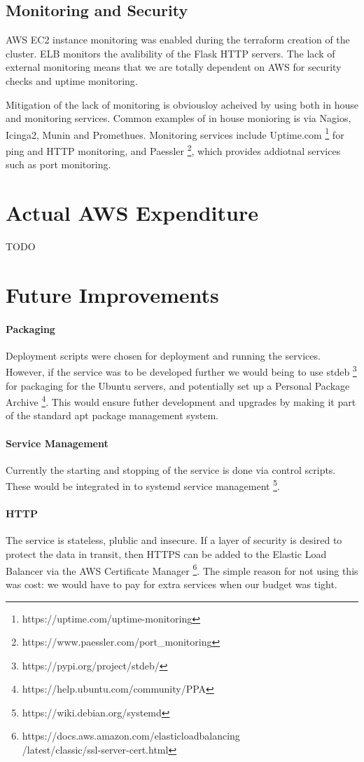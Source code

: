 \documentclass[conference]{IEEEtran}
\begin{document}
\subsection{Monitoring and Security}
AWS EC2 instance monitoring was enabled during the terraform creation of the cluster. ELB monitors the avalibility of the Flask HTTP servers. The lack of external monitoring means that we are totally dependent on AWS for security checks and uptime monitoring. \par
Mitigation of the lack of monitoring is obviousloy acheived by using both in house and monitoring services. Common examples of in house monioring is via Nagios, Icinga2, Munin and Promethues. Monitoring services include Uptime.com \footnote{https://uptime.com/uptime-monitoring} for ping and HTTP monitoring, and Paessler \footnote{https://www.paessler.com/port\_monitoring}, which provides addiotnal services such as port monitoring.

\section{Actual AWS Expenditure}
TODO
\section{Future Improvements}
\paragraph{Packaging}
Deployment scripts were chosen for deployment and running the services. However, if the service was to be developed further we would being to use stdeb \footnote{https://pypi.org/project/stdeb/} for packaging for the Ubuntu servers, and potentially set up a Personal Package Archive \footnote{https://help.ubuntu.com/community/PPA}. This would ensure futher development and upgrades by making it part of the standard apt package management system.
\paragraph{Service Management}
Currently the starting and stopping of the service is done via control scripts. These would be integrated in to systemd service management \footnote{https://wiki.debian.org/systemd}.
\paragraph{HTTP}
The service is stateless, plublic and insecure. If a layer of security is desired to protect the data in transit, then HTTPS can be added to the Elastic Load Balancer via the AWS Certificate Manager \footnote{https://docs.aws.amazon.com/elasticloadbalancing\\/latest/classic/ssl-server-cert.html}. The simple reason for not using this was cost: we would have to pay for extra services when our budget was tight.
\end{document}
